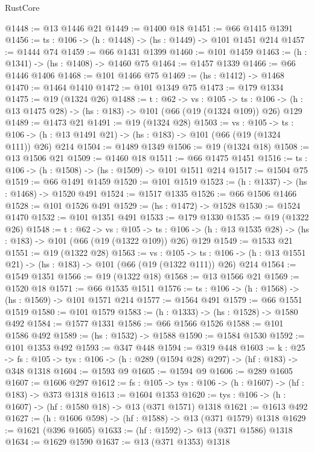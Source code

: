 \begin{lexlean}{RustCore}
\begin{coremodule}
@1448 := @13 @1446 @21
@1449 := @1400 @18
@1451 := @66 @1415 @1391
@1456 := {ts : @106} -> (h : @1448) -> (hs : @1449) -> @101 @1451 @214
@1457 := @1444 @74
@1459 := @66 @1431 @1399
@1460 := @101 @1459
@1463 := (h : @1341) -> (hs : @1408) -> @1460 @75
@1464 := @1457 @1339
@1466 := @66 @1446 @1406
@1468 := @101 @1466 @75
@1469 := (hs : @1412) -> @1468
@1470 := @1464 @1410
@1472 := @101 @1349 @75
@1473 := @179 @1334
@1475 := @19 (@1324 @26)
@1488 := {t : @62} ->
  {vs : @105} ->
  {ts : @106} -> (h : @13 @1475 @28) -> (hs : @183) -> @101 (@66 (@19 (@1324 @109)) @26) @129
@1489 := @1473 @21
@1491 := @19 (@1324 @28)
@1503 := {vs : @105} ->
  {ts : @106} -> (h : @13 @1491 @21) -> (hs : @183) -> @101 (@66 (@19 (@1324 @111)) @26) @214
@1504 := @1489 @1349
@1506 := @19 (@1324 @18)
@1508 := @13 @1506 @21
@1509 := @1460 @18
@1511 := @66 @1475 @1451
@1516 := {ts : @106} -> (h : @1508) -> (hs : @1509) -> @101 @1511 @214
@1517 := @1504 @75
@1519 := @66 @1491 @1459
@1520 := @101 @1519
@1523 := (h : @1337) -> (hs : @1468) -> @1520 @491
@1524 := @1517 @1335
@1526 := @66 @1506 @1466
@1528 := @101 @1526 @491
@1529 := (hs : @1472) -> @1528
@1530 := @1524 @1470
@1532 := @101 @1351 @491
@1533 := @179 @1330
@1535 := @19 (@1322 @26)
@1548 := {t : @62} ->
  {vs : @105} ->
  {ts : @106} -> (h : @13 @1535 @28) -> (hs : @183) -> @101 (@66 (@19 (@1322 @109)) @26) @129
@1549 := @1533 @21
@1551 := @19 (@1322 @28)
@1563 := {vs : @105} ->
  {ts : @106} -> (h : @13 @1551 @21) -> (hs : @183) -> @101 (@66 (@19 (@1322 @111)) @26) @214
@1564 := @1549 @1351
@1566 := @19 (@1322 @18)
@1568 := @13 @1566 @21
@1569 := @1520 @18
@1571 := @66 @1535 @1511
@1576 := {ts : @106} -> (h : @1568) -> (hs : @1569) -> @101 @1571 @214
@1577 := @1564 @491
@1579 := @66 @1551 @1519
@1580 := @101 @1579
@1583 := (h : @1333) -> (hs : @1528) -> @1580 @492
@1584 := @1577 @1331
@1586 := @66 @1566 @1526
@1588 := @101 @1586 @492
@1589 := (hs : @1532) -> @1588
@1590 := @1584 @1530
@1592 := @101 @1353 @492
@1593 := @347 @448
@1594 := @319 @448
@1603 := {k : @25} ->
  {fs : @105} -> {tys : @106} -> (h : @289 (@1594 @28) @297) -> (hf : @183) -> @348 @1318
@1604 := @1593 @9
@1605 := @1594 @9
@1606 := @289 @1605
@1607 := @1606 @297
@1612 := {fs : @105} -> {tys : @106} -> (h : @1607) -> (hf : @183) -> @373 @1318
@1613 := @1604 @1353
@1620 := {tys : @106} -> (h : @1607) -> (hf : @1580 @18) -> @13 (@371 @1571) @1318
@1621 := @1613 @492
@1627 := (h : @1606 @598) -> (hf : @1588) -> @13 (@371 @1579) @1318
@1629 := @1621 (@396 @1605)
@1633 := (hf : @1592) -> @13 (@371 @1586) @1318
@1634 := @1629 @1590
@1637 := @13 (@371 @1353) @1318

\end{coremodule}
\end{lexlean}
